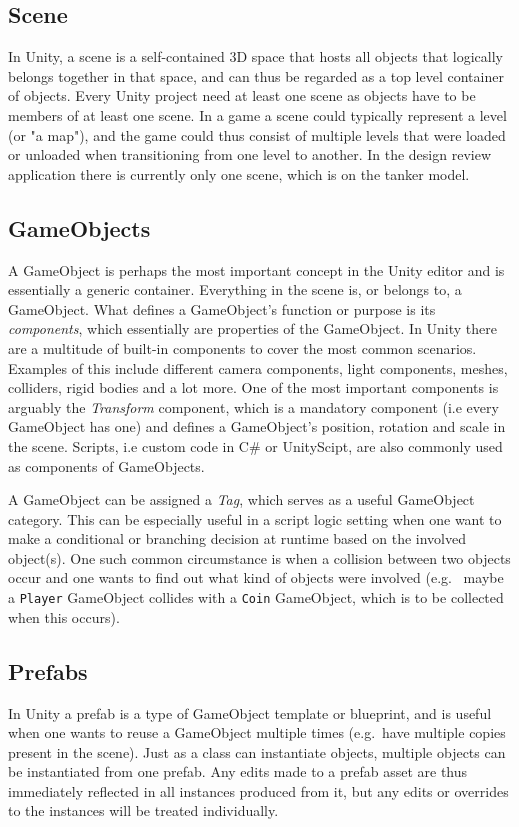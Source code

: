 \subsection{Scene}
In Unity, a scene is a self-contained 3D space that hosts all objects that logically belongs together in that space, and can thus be regarded 
as a top level container of objects. Every Unity project need at least one scene as objects have to be members of at least one scene.
In a game a scene could typically represent a level (or "a map"), and the game could
thus consist of multiple levels that were loaded or unloaded when transitioning from one level to another. 
In the design review application there is currently only one scene, which is on the tanker model.

\subsection{GameObjects}
A GameObject is perhaps the most important concept in the Unity editor and is essentially a generic container.
Everything in the scene is, or belongs to, a GameObject. What defines a GameObject's function or purpose is its \textit{components}, 
which essentially are properties of the GameObject. 
In Unity there are a multitude of built-in components to cover the most common scenarios. 
Examples of this include different camera components, light components, meshes, colliders, rigid bodies and a lot more.
One of the most important components is arguably the \textit{Transform} component, which is a mandatory component (i.e every GameObject has one) and 
defines a GameObject's position, rotation and scale in the scene. Scripts, i.e custom code in C\# or UnityScipt, are also commonly used as components of 
GameObjects.

A GameObject can be assigned a \textit{Tag}, which serves as a useful GameObject category. This can be especially useful in a script logic setting when one 
want to make a conditional or branching decision at runtime based on the involved object(s).
One such common circumstance is when a collision between two objects occur and one wants to find out what kind of objects were involved 
(e.g.~ maybe a \texttt{Player} GameObject collides with a \texttt{Coin} GameObject, which is to be collected when this occurs).   

\subsection{Prefabs}
In Unity a prefab is a type of GameObject template or blueprint, and is useful when one wants to reuse a GameObject multiple times (e.g.~have multiple copies present in the scene). 
Just as a class can instantiate objects, multiple objects can be instantiated from one prefab.
Any edits made to a prefab asset are thus immediately reflected in all instances produced from it, but any edits or overrides to the instances will be treated individually.

